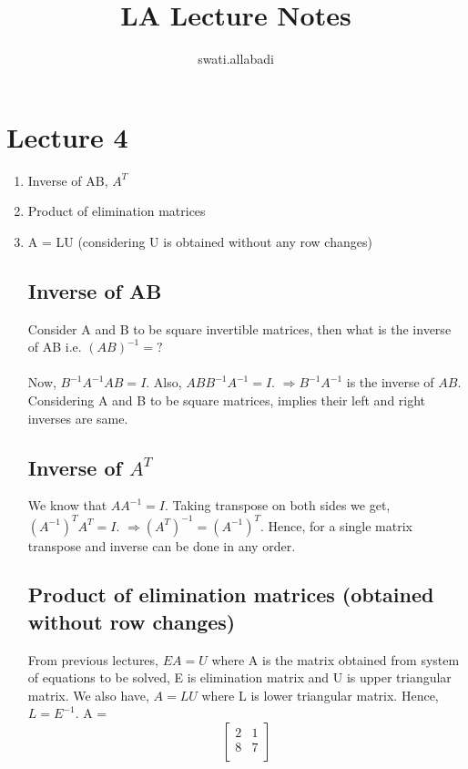 \documentclass{article}
\title{LA Lecture Notes}
\author{swati.allabadi }
\begin{document}
\maketitle

\section{Lecture 4}
\begin{enumerate}
    \item Inverse of AB, $A^T$
    \item Product of elimination matrices
    \item A = LU (considering U is obtained without any row changes)
    
    
\subsection{Inverse of AB}

Consider A and B to be square invertible matrices, then what is the inverse of AB i.e. $(AB)^{-1} = ?$
\\~\\
Now, $B^{-1}A^{-1}AB  = I $. Also, $ABB^{-1}A^{-1} = I$. 
\newline
$\Rightarrow B^{-1}A^{-1}$ is the inverse of $AB$.
\newline
Considering A and B to be square matrices, implies their left and right inverses are same. 

\subsection{Inverse of $A^T$}
We know that $AA^{-1} = I$. Taking transpose on both sides we get,
\newline
$(A^{-1})^{T}A^T = I$.
$\Rightarrow (A^T)^{-1} = (A^{-1})^{T} $.
\newline
Hence, for a single matrix transpose and inverse can be done in any order.

\subsection{Product of elimination matrices (obtained without row changes)}
From previous lectures, $EA = U $ where A is the matrix obtained from system of equations to be solved, E is elimination matrix and U is upper triangular matrix. We also have, $ A = LU$ where L is lower triangular matrix. Hence, $L = E^{-1}$.
\newline
A = \[ \begin{bmatrix}
2 & 1\\
8 & 7\\


\end{bmatrix}\]
\end{enumerate}
\end{document}
